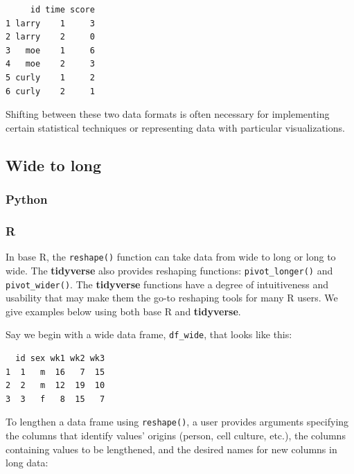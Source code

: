 \documentclass[
]{book}
\begin{document}
\begin{verbatim}
     id time score
1 larry    1     3
2 larry    2     0
3   moe    1     6
4   moe    2     3
5 curly    1     2
6 curly    2     1
\end{verbatim}

Shifting between these two data formats is often necessary for implementing certain statistical techniques or representing data with particular visualizations.

\hypertarget{wide-to-long}{%
\subsection{Wide to long}\label{wide-to-long}}

\hypertarget{python-29}{%
\subsubsection*{Python}\label{python-29}}

\hypertarget{r-29}{%
\subsubsection*{R}\label{r-29}}

In base R, the \texttt{reshape()} function can take data from wide to long or long to wide. The \textbf{tidyverse} also provides reshaping functions: \texttt{pivot\_longer()} and \texttt{pivot\_wider()}. The \textbf{tidyverse} functions have a degree of intuitiveness and usability that may make them the go-to reshaping tools for many R users. We give examples below using both base R and \textbf{tidyverse}.

Say we begin with a wide data frame, \texttt{df\_wide}, that looks like this:

\begin{verbatim}
  id sex wk1 wk2 wk3
1  1   m  16   7  15
2  2   m  12  19  10
3  3   f   8  15   7
\end{verbatim}

To lengthen a data frame using \texttt{reshape()}, a user provides arguments specifying the columns that identify values' origins (person, cell culture, etc.), the columns containing values to be lengthened, and the desired names for new columns in long data:
\end{document}

